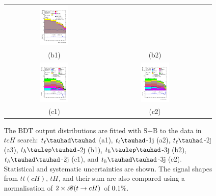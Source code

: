 \begin{figure}[H]
\begin{tabular}{@{}ccc@{}}
\includegraphics[width=0.3\textwidth]{figures/tcH_reg1l1tau1b3j_os.pdf}&\\

(b1) & (b2)  &  \\
\includegraphics[width=0.3\textwidth]{figures/tcH_reg2mtau1b2jos.pdf}&
\includegraphics[width=0.3\textwidth]{figures/tcH_reg2mtau1b3jos.pdf}&\\
(c1) & (c2)  &  \\
\end{tabular}
\caption{ The BDT output distributions are fitted with S+B to the data in $tcH$ search: $t_{\ell}\thadhad$ (a1),  $t_{\ell}\tauhad$-1j (a2),  $t_{\ell}\tauhad$-2j (a3),
  $t_h\tlhad$-2j (b1), $t_h\tlhad$-3j (b2), $t_h\thadhad$-2j (c1), and $t_h\thadhad$-3j (c2). Statistical and systematic uncertainties are shown.
  The signal shapes from $tt(cH)$, $tH$, and their sum are also compared using a normalisation of $2 \times\mathscr{B}(t\to cH)$ of 0.1\%.
}
\label{fig:asimov_postfitbdtHc}
\end{figure}

